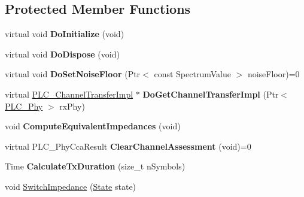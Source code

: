 \subsection*{\-Protected \-Member \-Functions}
\begin{DoxyCompactItemize}
\item 
\hypertarget{classns3_1_1PLC__HalfDuplexOfdmPhy_a4ccdaa92b8f91a0530da9bba78d4f4ee}{virtual void {\bfseries \-Do\-Initialize} (void)}\label{classns3_1_1PLC__HalfDuplexOfdmPhy_a4ccdaa92b8f91a0530da9bba78d4f4ee}

\item 
\hypertarget{classns3_1_1PLC__HalfDuplexOfdmPhy_a4426554b2fc88ca89ebe521b1229dd01}{virtual void {\bfseries \-Do\-Dispose} (void)}\label{classns3_1_1PLC__HalfDuplexOfdmPhy_a4426554b2fc88ca89ebe521b1229dd01}

\item 
\hypertarget{classns3_1_1PLC__HalfDuplexOfdmPhy_ad83e7c2c13d9c39fd3c0edf6d9fef730}{virtual void {\bfseries \-Do\-Set\-Noise\-Floor} (\-Ptr$<$ const \-Spectrum\-Value $>$ noise\-Floor)=0}\label{classns3_1_1PLC__HalfDuplexOfdmPhy_ad83e7c2c13d9c39fd3c0edf6d9fef730}

\item 
\hypertarget{classns3_1_1PLC__HalfDuplexOfdmPhy_a45fe71a9301d4e0824729664f7cf69f0}{virtual \hyperlink{classns3_1_1PLC__ChannelTransferImpl}{\-P\-L\-C\-\_\-\-Channel\-Transfer\-Impl} $\ast$ {\bfseries \-Do\-Get\-Channel\-Transfer\-Impl} (\-Ptr$<$ \hyperlink{classns3_1_1PLC__Phy}{\-P\-L\-C\-\_\-\-Phy} $>$ rx\-Phy)}\label{classns3_1_1PLC__HalfDuplexOfdmPhy_a45fe71a9301d4e0824729664f7cf69f0}

\item 
\hypertarget{classns3_1_1PLC__HalfDuplexOfdmPhy_a90f00571701cf79b3c3ee3d61d48b4cb}{void {\bfseries \-Compute\-Equivalent\-Impedances} (void)}\label{classns3_1_1PLC__HalfDuplexOfdmPhy_a90f00571701cf79b3c3ee3d61d48b4cb}

\item 
\hypertarget{classns3_1_1PLC__HalfDuplexOfdmPhy_a544c0c9fba81da60a7fc3974e72d2f2c}{virtual \-P\-L\-C\-\_\-\-Phy\-Cca\-Result {\bfseries \-Clear\-Channel\-Assessment} (void)=0}\label{classns3_1_1PLC__HalfDuplexOfdmPhy_a544c0c9fba81da60a7fc3974e72d2f2c}

\item 
\hypertarget{classns3_1_1PLC__HalfDuplexOfdmPhy_a16d8bb82f9d9261e1de673cf88649512}{\-Time {\bfseries \-Calculate\-Tx\-Duration} (size\-\_\-t n\-Symbols)}\label{classns3_1_1PLC__HalfDuplexOfdmPhy_a16d8bb82f9d9261e1de673cf88649512}

\item 
void \hyperlink{classns3_1_1PLC__HalfDuplexOfdmPhy_afff34328dc4f9eb43f856f9219992889}{\-Switch\-Impedance} (\hyperlink{classns3_1_1PLC__HalfDuplexOfdmPhy_ae91e168f9a51bf5344e7e03d9ae13b60}{\-State} state)
\end{DoxyCompactItemize}
